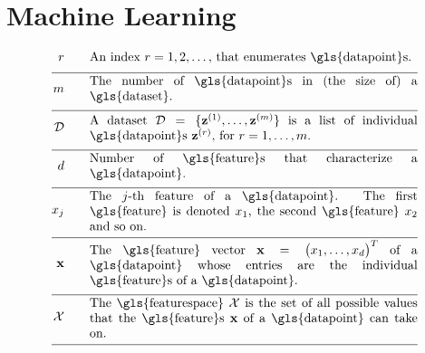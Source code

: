 \newpage
\section*{Machine Learning}

\begin{align}
	\sampleidx \quad\quad & \parbox{.75\textwidth}{An index $\sampleidx=1,2,\ldots,$ that 
		enumerates \gls{datapoint}s.}   \nonumber \\[2mm] \hline \nonumber\\[-5mm]
	\samplesize \quad\quad &\parbox{.75\textwidth}{The number of \gls{datapoint}s in (the size of) a \gls{dataset}.} \nonumber \\[2mm] \hline \nonumber\\[-5mm] 
	\dataset \quad\quad & \parbox{.75\textwidth}{A dataset $\dataset = \{ \datapoint^{(1)},\ldots, \datapoint^{(\samplesize)} \}$ 
		is a list of individual \gls{datapoint}s $\datapoint^{(\sampleidx)}$, for $\sampleidx=1,\ldots,\samplesize$.}   \nonumber \\[2mm] \hline \nonumber\\[-5mm]
	\featurelen \quad\quad &\parbox{.75\textwidth}{Number of \gls{feature}s that characterize a \gls{datapoint}.}\nonumber \\[2mm] \hline \nonumber\\[-5mm]
	\feature_{\featureidx} \quad\quad &\parbox{.75\textwidth}{The $\featureidx$-th feature of a \gls{datapoint}. The first \gls{feature} 
		is denoted $\feature_{1}$, the second \gls{feature} $\feature_{2}$ and so on. } \nonumber \\[2mm] \hline \nonumber\\[-5mm] 
	\featurevec \quad\quad &\parbox{.75\textwidth}{The \gls{feature} vector $\featurevec=\big(\feature_{1},\ldots,\feature_{\featuredim}\big)^{T}$ of a \gls{datapoint} whose entries are the individual \gls{feature}s of a \gls{datapoint}.}\nonumber \\[2mm] \hline \nonumber\\[-5mm]
	\featurespace \quad\quad & \parbox{.75\textwidth}{The \gls{featurespace} $\featurespace$ is 
		the set of all possible values that the \gls{feature}s $\featurevec$ of a \gls{datapoint} can take on.} \nonumber \\[2mm] \hline \nonumber\\[-5mm]

\end{align}
